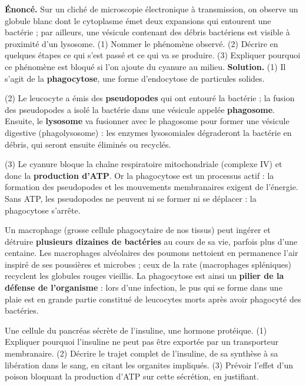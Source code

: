 \documentclass[11pt]{article}
\newcommand{\cle}[1]{{\popxbold\color{popdark}#1}}
\begin{document}
\begin{exoresolu}
\textbf{Énoncé.} Sur un cliché de microscopie électronique à transmission, on observe un globule blanc dont le cytoplasme émet deux expansions qui entourent une bactérie ; par ailleurs, une vésicule contenant des débris bactériens est visible à proximité d'un lysosome. (1) Nommer le phénomène observé. (2) Décrire en quelques étapes ce qui s'est passé et ce qui va se produire. (3) Expliquer pourquoi ce phénomène est bloqué si l'on ajoute du cyanure au milieu.
\tcblower
\textbf{Solution.} (1) Il s'agit de la \textbf{phagocytose}, une forme d'endocytose de particules solides.

(2) Le leucocyte a émis des \textbf{pseudopodes} qui ont entouré la bactérie ; la fusion des pseudopodes a isolé la bactérie dans une vésicule appelée \textbf{phagosome}. Ensuite, le \textbf{lysosome} va fusionner avec le phagosome pour former une vésicule digestive (phagolysosome) : les enzymes lysosomiales dégraderont la bactérie en débris, qui seront ensuite éliminés ou recyclés.

(3) Le cyanure bloque la chaîne respiratoire mitochondriale (complexe IV) et donc la \textbf{production d'ATP}. Or la phagocytose est un processus actif : la formation des pseudopodes et les mouvements membranaires exigent de l'énergie. Sans ATP, les pseudopodes ne peuvent ni se former ni se déplacer : la phagocytose s'arrête.
\end{exoresolu}

\begin{savaistu}
Un \cle{macrophage} (grosse cellule phagocytaire de nos tissus) peut ingérer et détruire \textbf{plusieurs dizaines de bactéries} au cours de sa vie, parfois plus d'une centaine. Les macrophages alvéolaires des poumons nettoient en permanence l'air inspiré de ses poussières et microbes ; ceux de la rate (macrophages spléniques) recyclent les globules rouges vieillis. La phagocytose est ainsi un \textbf{pilier de la défense de l'organisme} : lors d'une infection, le pus qui se forme dans une plaie est en grande partie constitué de leucocytes morts après avoir phagocyté des bactéries.
\end{savaistu}

\begin{exercice}
Une cellule du pancréas sécrète de l'insuline, une hormone protéique. (1) Expliquer pourquoi l'insuline ne peut pas être exportée par un transporteur membranaire. (2) Décrire le trajet complet de l'insuline, de sa synthèse à sa libération dans le sang, en citant les organites impliqués. (3) Prévoir l'effet d'un poison bloquant la production d'ATP sur cette sécrétion, en justifiant.
\end{exercice}
\end{document}
